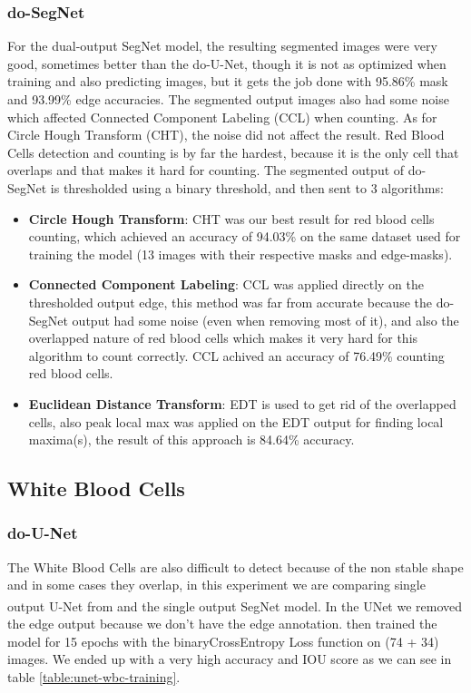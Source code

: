 

\subsubsection{do-SegNet}
For the dual-output SegNet model, the resulting segmented images were very good, sometimes better than the do-U-Net, though it is not as optimized when training and also predicting images, but it gets the job done with 95.86\% mask and 93.99\% edge accuracies. The segmented output images also had some noise which affected Connected Component Labeling (CCL) when counting.
As for Circle Hough Transform (CHT), the noise did not affect the result.
Red Blood Cells detection and counting is by far the hardest, because it is the only cell that overlaps and that makes it hard for counting.
The segmented output of do-SegNet is thresholded using a binary threshold, and then sent to 3 algorithms:

\begin{itemize}
  \item \textbf{Circle Hough Transform}: CHT was our best result for red blood cells counting, which achieved an accuracy of 94.03\% on the same dataset used for training the model (13 images with their respective masks and edge-masks).
  \item \textbf{Connected Component Labeling}: CCL was applied directly on the thresholded output edge, this method was far from accurate because the do-SegNet output had some noise (even when removing most of it), and also the overlapped nature of red blood cells which makes it very hard for this algorithm to count correctly. CCL achived an accuracy of 76.49\% counting red blood cells.
  \item \textbf{Euclidean Distance Transform}: EDT is used to get rid of the overlapped cells, also peak local max was applied on the EDT output for finding local maxima(s), the result of this approach is 84.64\% accuracy.
\end{itemize}



\subsection{White Blood Cells}
\subsubsection{do-U-Net}
The White Blood Cells are also difficult to detect because of the non stable shape and in some cases they overlap, in this experiment we are comparing single output U-Net from \textsuperscript{\cite{10.1007/978-3-030-44584-3_31}} and the single output SegNet model.
In the UNet we removed the edge output because we don't have the edge annotation. then trained the model for 15 epochs with the binaryCrossEntropy Loss function on (74 + 34) images. 
We ended up with a very high accuracy and IOU score as we can see in table \ref{table:unet-wbc-training}.

